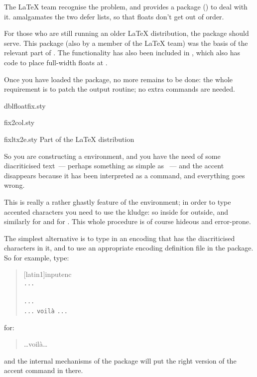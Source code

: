 The \LaTeX{} team recognise the problem, and provides a package
() to deal with it.   amalgamates
the two defer lists, so that floats don't get out of order.

For those who are still running an older \LaTeX{} distribution, the
package  should serve.  This package (also by a
member of the \LaTeX{} team) was the basis of the relevant part of
.  The functionality has also been included in
, which also has code to place full-width floats
at .

Once you have loaded the package, no more remains to be done: the
whole requirement is to patch the output routine; no extra commands
are needed.
\begin{ctanrefs}
\item[dblfloatfix.sty]
\item[fix2col.sty]
\item[fixltx2e.sty]Part of the \LaTeX{} distribution
\end{ctanrefs}


So you are constructing a  environment, and you
have the need of some diacriticised text~--- perhaps something as simple
as ~--- and the accent disappears because it has been
interpreted as a  command, and everything goes
wrong.

This is really a rather ghastly feature of the 
environment; in order to type accented characters you need to use the
 kludge: so  inside  for
 outside, and similarly  for  and 
for \csx{=}.  This whole procedure is of course hideous and
error-prone.

The simplest alternative is to type in an encoding that has the
diacriticised characters in it, and to use an appropriate encoding
definition file in the  package.  So for example,
type:
\begin{quote}
  [latin1]{inputenc}\\
  \texttt{...}\\
  \\
  \texttt{...}\\
  \texttt{...} \csx{>} \texttt{voil\`a} \csx{>} \texttt{...}
\end{quote}
for:
\begin{quote}
  \dots{}\quad voil\`a\quad \dots{}
\end{quote}
and the internal mechanisms of the  package will put
the right version of the accent command in there.

